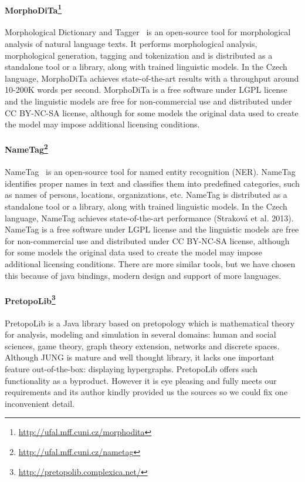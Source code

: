\paragraph{MorphoDiTa\footnote{\url{http://ufal.mff.cuni.cz/morphodita}}}
Morphological Dictionary and Tagger~\cite{spoustova09, strakova14} is an open-source tool for morphological
analysis of natural language texts. It performs morphological analysis, 
morphological generation, tagging and tokenization and is distributed as
a standalone tool or a library, along with trained linguistic models. In
the Czech language, MorphoDiTa achieves state-of-the-art results with 
a throughput around 10-200K words per second. MorphoDiTa is a free software
under LGPL license and the linguistic models are free for non-commercial use
and distributed under CC BY-NC-SA license, although for some models the original
data used to create the model may impose additional licensing conditions.

\paragraph{NameTag\footnote{\url{http://ufal.mff.cuni.cz/nametag}}}
NameTag~\cite{strakova14} is an open-source tool for named entity recognition (NER). NameTag 
identifies proper names in text and classifies them into predefined categories,
such as names of persons, locations, organizations, etc. NameTag is distributed
as a standalone tool or a library, along with trained linguistic models.
In the Czech language, NameTag achieves state-of-the-art performance
(Straková et al. 2013). NameTag is a free software under LGPL license and the 
linguistic models are free for non-commercial use and distributed under CC 
BY-NC-SA license, although for some models the original data used to create
the model may impose additional licensing conditions. There are more similar
tools, but we have chosen this because of java bindings, modern design and
support of more languages.

\paragraph{PretopoLib\footnote{\url{http://pretopolib.complexica.net/}}}
PretopoLib is a Java library based on pretopology which is mathematical theory
for analysis, modeling and simulation in several domains: human and social
sciences, game theory, graph theory extension, networks and discrete spaces.
Although JUNG is mature and well thought library, it lacks one important feature
out-of-the-box: displaying hypergraphs. PretopoLib offers such functionality
as a byproduct. However it is eye pleasing and fully meets our requirements and
its author kindly provided us the sources so we could fix one inconvenient
detail.


